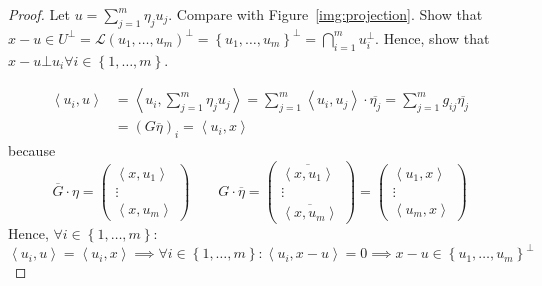 \documentclass[a4paper]{article}
\numberwithin{lecref}{section}
\newcommand{\set}[1]{\left\{#1\right\}}
\newcommand{\ip}[2]{\left\langle#1,#2\right\rangle} %
\begin{document}
\begin{proof}
  Let $u = \sum_{j=1}^m \eta_j u_j$. Compare with Figure~\ref{img:projection}.
  Show that $x - u \in U^{\bot} = \mathcal L(u_1, \ldots, u_m)^\bot = \set{u_1, \ldots, u_m}^\bot = \bigcap_{i=1}^m u_i^\bot$.
  Hence, show that $x - u \bot u_i \forall i \in \set{1, \ldots, m}$.

  \begin{align*}
    \ip{u_i}{u} &= \ip{u_i}{\sum_{j=1}^m \eta_j u_j}
      = \sum_{j=1}^m \ip{u_i}{u_j} \cdot \overline{\eta_j}
      = \sum_{j=1}^m g_{ij} \overline{\eta_j} \\
      &= (G \overline{\eta})_i
      = \ip{u_i}{x}
  \end{align*}
  because
  \[
    \overline G \cdot \eta = \begin{pmatrix} \ip{x}{u_1} \\ \vdots \\ \ip{x}{u_m} \end{pmatrix}  \qquad
    G \cdot \overline \eta = \begin{pmatrix}
      \overline{\ip{x}{u_1}} \\
      \vdots \\
      \overline{\ip{x}{u_m}}
    \end{pmatrix} =
    \begin{pmatrix}
      \ip{u_1}{x} \\
      \vdots \\ 
      \ip{u_m}{x}
    \end{pmatrix}
  \]
  Hence, $\forall i \in \set{1, \ldots, m}$:
  \[ \ip{u_i}{u} = \ip{u_i}{x} \implies \forall i \in \set{1, \ldots, m}: \ip{u_i}{x - u} = 0 \implies x - u \in \set{u_1, \ldots, u_m}^\bot \]
\end{proof}
\end{document}
